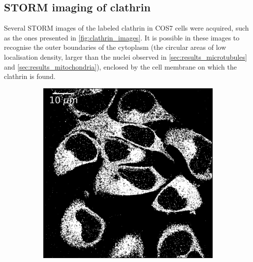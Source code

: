 \subsection{STORM imaging of clathrin} \label{sec:results_clathrin}
Several STORM images of the labeled clathrin in COS7 cells were acquired, such as the ones presented in \autoref{fig:clathrin_images}.
It is possible in these images to recognise the outer boundaries of the cytoplasm (the circular areas of low localisation density, larger than the nuclei observed in \autoref{sec:results_microtubules} and \autoref{sec:results_mitochondria}), enclosed by the cell membrane on which the clathrin is found.
%
\begin{figure}
    \centering
    \begin{subfigure}{0.49\textwidth}
        \includegraphics[width=\textwidth]{figures/clathrin_image11.png}
        \caption{}
        \label{fig:clathrin_image1}
    \end{subfigure}
    \begin{subfigure}{0.49\textwidth}

\end{subfigure}
\end{figure}
